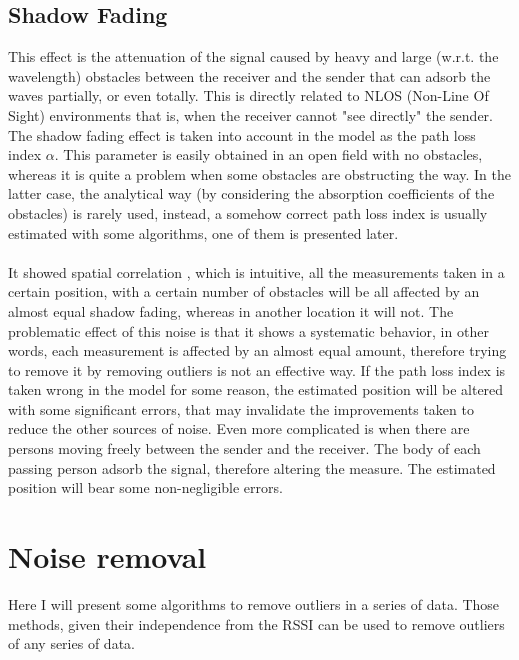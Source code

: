 \documentclass[12pt]{report}
\begin{document}
\section{Shadow Fading}
This effect is the attenuation of the signal caused by heavy and large (w.r.t. the wavelength) obstacles between the receiver and the sender that can adsorb the waves partially, or even totally. This is directly related to NLOS (Non-Line Of Sight) environments that is, when the receiver cannot "see directly" the sender. The shadow fading effect is taken into account in the model as the path loss index $\alpha$. This parameter is easily obtained in an open field with no obstacles, whereas it is quite a problem when some obstacles are obstructing the way. In the latter case, the analytical way (by considering the absorption coefficients of the obstacles) is rarely used, instead, a somehow correct path loss index is usually estimated with some algorithms, one of them is presented later.\\\\ 
It showed spatial correlation \cite{244122,732812}, which is intuitive, all the measurements taken in a certain position, with a certain number of obstacles will be all affected by an almost equal shadow fading, whereas in another location it will not. The problematic effect of this noise is that it shows a systematic behavior, in other words, each measurement is affected by an almost equal amount, therefore trying to remove it by removing outliers is not an effective way. If the path loss index is taken wrong in the model for some reason, the estimated position will be altered with some significant errors, that may invalidate the improvements taken to reduce the other sources of noise. Even more complicated is when there are persons moving freely between the sender and the receiver. The body of each passing person adsorb the signal, therefore altering the measure. The estimated position will bear some non-negligible errors.

\chapter{Noise removal}
Here I will present some algorithms to remove outliers in a series of data. Those methods, given their independence from the RSSI can be used to remove outliers of any series of data.
\end{document}
